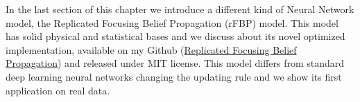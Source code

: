 \documentclass{standalone}
\begin{document}
In the last section of this chapter we introduce a different kind of Neural Network model, the \textsf{Replicated Focusing Belief Propagation} (rFBP) model.
This model has solid physical and statistical bases and we discuss about its novel optimized implementation, available on my Github (\href{https://github.com/Nico-Curti/rFBP}{Replicated Focusing Belief Propagation}) and released under MIT license.
This model differs from standard deep learning neural networks changing the updating rule and we show its first application on real data.
\end{document}
